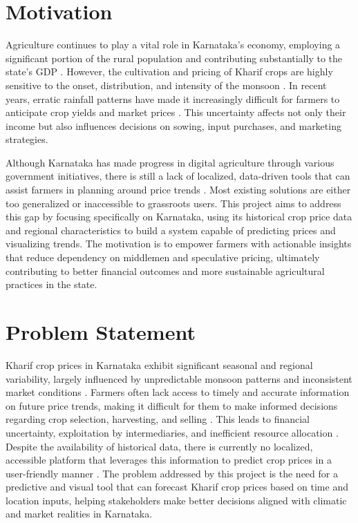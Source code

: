 \section[Motivation]{\textbf{Motivation}}

Agriculture continues to play a vital role in Karnataka's economy, employing a significant portion of the rural population and contributing substantially to the state's GDP \cite{niti2024, kgisac2023}. However, the cultivation and pricing of Kharif crops are highly sensitive to the onset, distribution, and intensity of the monsoon \cite{prasanna2014, gadgil2006monsoon}. In recent years, erratic rainfall patterns have made it increasingly difficult for farmers to anticipate crop yields and market prices \cite{prasanna2014, reuters_mon2025}. This uncertainty affects not only their income but also influences decisions on sowing, input purchases, and marketing strategies.

Although Karnataka has made progress in digital agriculture through various government initiatives, there is still a lack of localized, data-driven tools that can assist farmers in planning around price trends \cite{niti2024_gov}. Most existing solutions are either too generalized or inaccessible to grassroots users. This project aims to address this gap by focusing specifically on Karnataka, using its historical crop price data and regional characteristics to build a system capable of predicting prices and visualizing trends. The motivation is to empower farmers with actionable insights that reduce dependency on middlemen and speculative pricing, ultimately contributing to better financial outcomes and more sustainable agricultural practices in the state.

\section[Problem Statement]{\textbf{Problem Statement}}

Kharif crop prices in Karnataka exhibit significant seasonal and regional variability, largely influenced by unpredictable monsoon patterns and inconsistent market conditions \cite{prasanna2014, gadgil2006monsoon, henrich2020rainfall}. Farmers often lack access to timely and accurate information on future price trends, making it difficult for them to make informed decisions regarding crop selection, harvesting, and selling \cite{cariappa2020impact, jain2020deep}. This leads to financial uncertainty, exploitation by intermediaries, and inefficient resource allocation \cite{singh2024ai, niti2024}. Despite the availability of historical data, there is currently no localized, accessible platform that leverages this information to predict crop prices in a user-friendly manner \cite{tripathi2021mapping, mahmud2025price}. The problem addressed by this project is the need for a predictive and visual tool that can forecast Kharif crop prices based on time and location inputs, helping stakeholders make better decisions aligned with climatic and market realities in Karnataka.

